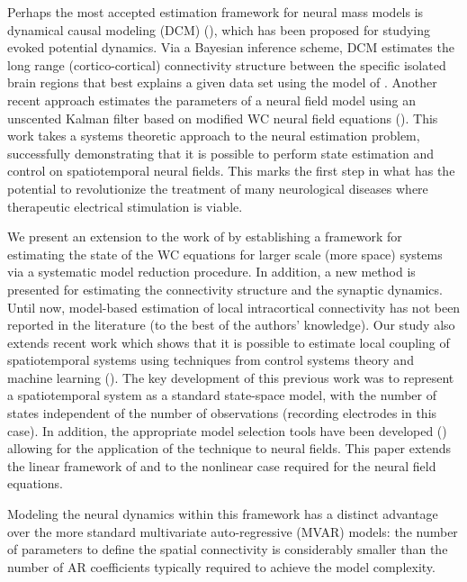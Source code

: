 \documentclass[5p,authoryear]{elsarticle}
\begin{document}
Perhaps the most accepted estimation framework for neural mass models is dynamical causal modeling (DCM) (\cite{David2003,David2006}), which has been proposed for studying evoked potential dynamics. Via a Bayesian inference scheme, DCM estimates the long range (cortico-cortical) connectivity structure between the specific isolated brain regions that best explains a given data set using the model of \cite{Jansen1995}. Another recent approach estimates the parameters of a neural field model using an unscented Kalman filter based on modified WC neural field equations (\cite{schiff2008kalman}). This work takes a systems theoretic approach to the neural estimation problem, successfully demonstrating that it is possible to perform state estimation and control on spatiotemporal neural fields. This marks the first step in what has the potential to revolutionize the treatment of many neurological diseases where therapeutic electrical stimulation is viable.

We present an extension to the work of \cite{schiff2008kalman} by establishing a framework for estimating the state of the WC equations for larger scale (more space) systems via a systematic model reduction procedure. In addition, a new method is presented for estimating the connectivity structure and the synaptic dynamics. Until now, model-based estimation of local intracortical connectivity has not been reported in the literature (to the best of the authors' knowledge). Our study also extends recent work which shows that it is possible to estimate local coupling of spatiotemporal systems using techniques from control systems theory and machine learning (\cite{Dewar2009}). The key development of this previous work was to represent a spatiotemporal system as a standard state-space model, with the number of states independent of the number of observations (recording electrodes in this case). In addition, the appropriate model selection tools have been developed (\cite{Scerri2009}) allowing for the application of the technique to neural fields. This paper extends the linear framework of \cite{Dewar2009} and \cite{Scerri2009} to the nonlinear case required for the neural field equations. 

Modeling the neural dynamics within this framework has a distinct advantage over the more standard multivariate auto-regressive (MVAR) models: the number of parameters to define the spatial connectivity is considerably smaller than the number of AR coefficients typically required to achieve the model complexity. 
\end{document}
